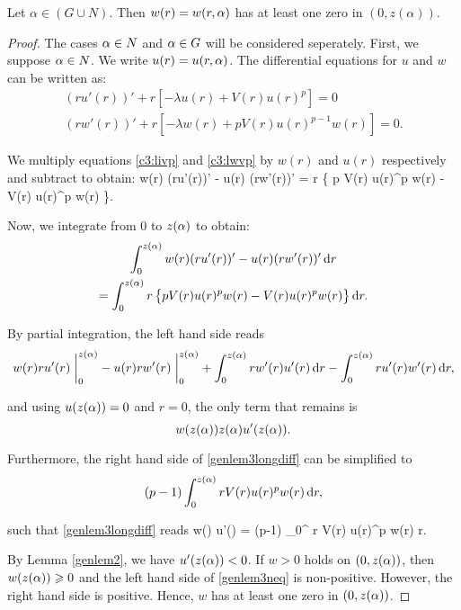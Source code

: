 \begin{lemma}\label{genlem3}
Let $\alpha\in (G\cup N).$ Then $w(r)=w(r,\alpha)$ has at least one zero in $(0,z(\alpha))$.
\end{lemma}
\begin{proof}
The cases $\alpha\in N$ and $\alpha\in G$ will be considered seperately. First, we
suppose $\alpha\in N$. We write $u(r) = u(r, \alpha)$. The differential equations for
$u$ and $w$ can be written as:
\begin{gather}
\label{c3:livp}  (ru'(r))'+r\left[-\lambda u(r)+V(r)u(r)^p\right]=0\\
\label{c3:lwvp}  (rw'(r))'+r\left[-\lambda w(r)+pV(r)u(r)^{p-1}w(r)\right]=0.
\end{gather}


We multiply equations \eqref{c3:livp} and \eqref{c3:lwvp} by $w(r)$ and $u(r)$
respectively and subtract to obtain:
\be \label{uwdiff}
    w(r) (ru'(r))' - u(r) (rw'(r))' = r \left\{ p V(r) u(r)^p w(r) - 
    V(r) u(r)^p w(r) \right\}.
\ee

Now, we integrate from $0$ to $z(\alpha)$ to obtain: 
\begin{multline} \label{genlem3longdiff}
  \int_0^{z(\alpha)}w(r)(ru'(r))'-u(r)(rw'(r))'\mathop{}\!\mathrm{d} r\\
  = \int_0^{z(\alpha)}r\left\{pV(r)u(r)^pw(r)-V(r)u(r)^pw(r)\right\}\mathop{}\!\mathrm{d} r.
\end{multline}

By partial integration, the left hand side reads
\[
w(r) r u'(r) \at_0^{\za} - u(r) r w'(r) \at_0^{\za} 
+ \int_0^{\za} r w'(r) u'(r) \diff r - \int_0^{\za} r u'(r) w'(r) \diff r,
\]

and using $u(z(\alpha)) = 0$ and $r = 0$, the only term that remains is
\[
    w(z(\alpha)) z(\alpha) u'(z(\alpha)).
\]

Furthermore, the right hand side of \eqref{genlem3longdiff} can be simplified to
\[
    (p-1) \int_0^{z(\alpha)} r V(r) u(r)^p w(r) \mathop{}\!\mathrm{d} r,
\]

such that \eqref{genlem3longdiff} reads
\be \label{genlem3neq}
w(\za) \za u'(\za) = (p-1) \int_0^{\za} r V(r) u(r)^p w(r) \diff r.
\ee

By Lemma \ref{genlem2}, we have $u'(z(\alpha)) < 0$. If $w > 0$ holds on $(0, z(\alpha))$,
then $w(z(\alpha)) \geqslant 0$ and the left hand side of \eqref{genlem3neq} is
non-positive. However, the right hand side is positive. Hence, $w$ has at least
one zero in $(0, z(\alpha))$. 


\end{proof}
